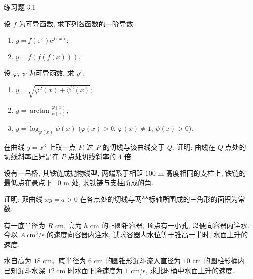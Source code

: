 \begin{exblock}{练习题 3.1}
  \item 设 $f$ 为可导函数, 求下列各函数的一阶导数:
  \begin{enumerate}[label=(\arabic*)]
    \item $y = f(\mathrm{e}^x)\mathrm{e}^{f(x)}$;
    \item $y = f(f(f(x)))$.
  \end{enumerate}

  \item 设 $\varphi$, $\psi$ 为可导函数, 求 $y'$:
  \begin{enumerate}[label=(\arabic*)]
    \item $y = \sqrt{\varphi^2(x) + \psi^2(x)}$;
    \item $y = \arctan\frac{\varphi(x)}{\psi(x)}$;
    \item $y = \log_{\varphi(x)}\psi(x)$ ($\varphi(x) > 0$, $\varphi(x) \neq 1$, $\psi(x) > 0$).
  \end{enumerate}

  \item 在曲线 $y = x^3$ 上取一点 $P$, 过 $P$ 的切线与该曲线交于 $Q$. 证明: 曲线在 $Q$ 点处的切线斜率正好是在 $P$ 点处切线斜率的 $4$ 倍.

  \item 设有一吊桥, 其铁链成抛物线型, 两端系于相距 $100$ m 高度相同的支柱上, 铁链的最低点在悬点下 $10$ m 处, 求铁链与支柱所成的角.

  \item 证明: 双曲线 $xy = a > 0$ 在各点处的切线与两坐标轴所围成的三角形的面积为常数.

  \item 有一底半径为 $R$ cm, 高为 $h$ cm 的正圆锥容器, 顶点有一小孔, 以便向容器内注水. 今以 $A\ \text{cm}^3/\text{s}$ 的速度向容器内注水, 试求容器内水位等于锥高一半时, 水面上升的速度.

  \item 水自高为 $18$ cm、底半径为 $6$ cm 的圆锥形漏斗流入直径为 $10$ cm 的圆柱形桶内. 已知漏斗水深 $12$ cm 时水面下降速度为 $1$ cm/s, 求此时桶中水面上升的速度.
\end{exblock}

